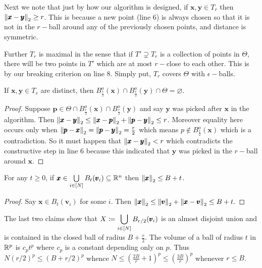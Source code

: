 Next we note that just by how our algorithm is designed, if $\pmb x,\pmb y\in T_{r}$ then $\left\lVert \pmb x-\pmb y \right\rVert_{2}\ge r$. This is because a new point (line $6$) is always chosen so that it is not in the $r-$ball around any of the previously chosen points, and distance is symmetric.

Further $T_{r}$ is maximal in the sense that if $T'\supsetneq T_{r}$ is a collection of points in $\Theta$, there will be two points in $T'$ which are at most $r-$close to each other. This is by our breaking criterion on line $8$. Simply put, $T_{r}$ covers $\Theta$ with $\epsilon-$balls.

\begin{cl}\label{disj}
If $\pmb x,\pmb y\in T_{r}$ are distinct, then $B_{\frac{r}{2}}^{o}(\pmb x)\cap B_{\frac{r}{2}}^{o}(\pmb y) \cap \Theta = \varnothing$.
\end{cl}
\begin{proof}
Suppose $\pmb p\in \Theta\cap B_{\frac{r}{2}}^{o}(\pmb x)\cap B_{\frac{r}{2}}^{o}(\pmb y)$ and say $\pmb y$ was picked after $\pmb x$ in the algorithm. Then $\left\lVert \pmb x-\pmb y \right\rVert_{2}\le \left\lVert \pmb x-\pmb p \right\rVert_{2} + \left\lVert \pmb p-\pmb y \right\rVert_{2} \le r$. Moreover equality here occurs only when $\left\lVert \pmb p-\pmb x \right\rVert_{2} = \left\lVert \pmb p-\pmb y \right\rVert_{2}=\frac{r}{2}$ which means $p\notin B_{\frac r2}^{o}(\pmb x)$ which is a contradiction. So it must happen that $\left\lVert \pmb x-\pmb y \right\rVert_{2}<r$ which contradicts the constructive step in line $6$ because this indicated that $\pmb y$ was picked in the $r-$ball around $\pmb x$.
\end{proof}

\begin{cl}\label{ball}
For any $t\ge 0$, if $\pmb x\in \bigcup\limits_{i\in [N]}B_{t}(\pmb v_{i})\subseteq \mathbb{R}^{n}$ then $\left\lVert \pmb x \right\rVert_{2}\le B+t$.
\end{cl}
\begin{proof}
Say $\pmb x\in B_{t}(\pmb v_{i})$ for some $i$. Then 
$\left\lVert \pmb x \right\rVert_{2} \le \left\lVert \pmb v \right\rVert_{2} + \left\lVert \pmb x-\pmb v \right\rVert_{2} \le B+t.$
\end{proof}

The last two claims show that $\displaystyle X\coloneqq\bigcup\limits_{i\in [N]}B_{r/2}(\pmb v_{i})$ is an almost disjoint union and is contained in the closed ball of radius $B+\frac r2$. The volume of a ball of radius $t$ in $\mathbb{R}^{p}$ is $c_{p}t^{p}$ where $c_{p}$ is a constant depending only on $p$. Thus $N(r/2)^{p} \le (B+r/2)^{p}$ whence $N\le \left(\frac{2B}{r}+1\right)^{p} \le \left(\frac{3B}{r}\right)^{p}$ whenever $r\le B$.






























